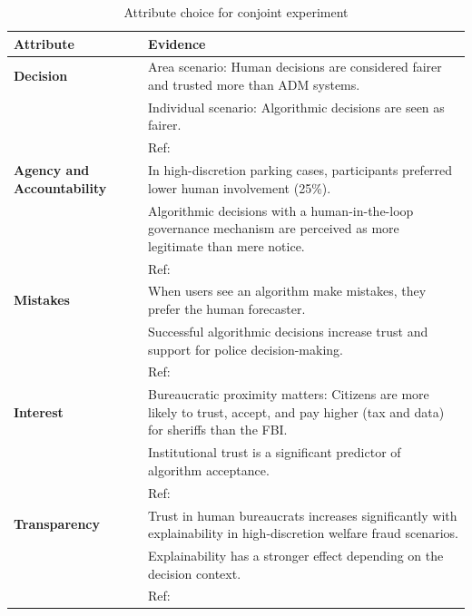 \begin{table}[H]
\centering
\renewcommand{\arraystretch}{1.3} %
\setlength{\tabcolsep}{6pt} %
\begin{tabular}[t]{|p{4cm}|p{10.5cm}|}
\hline
\textbf{Attribute} & \textbf{Evidence} \\ 
\hline
\textbf{Decision} & 
Area scenario: Human decisions are considered fairer and trusted more than ADM systems.  \\ 
& Individual scenario: Algorithmic decisions are seen as fairer. \citep{Hobson2021} \\ 
& Ref: \citep{Hobson2021, meier1975representative, Miller2020} \\  
\hline
\textbf{Agency and Accountability} & 
In high-discretion parking cases, participants preferred lower human involvement (25\%). \citep{Horvath2023} \\ 
& Algorithmic decisions with a human-in-the-loop governance mechanism are perceived as more legitimate than mere notice. \citep{Waldman2022} \\  
& Ref: \citep{Grimmelikhuijsen2022, Hobson2021, Horvath2023, Waldman2022, Schaap2023} \\  
\hline
\textbf{Mistakes} & 
When users see an algorithm make mistakes, they prefer the human forecaster. \citep{dietvorst2015algorithm} \\ 
& Successful algorithmic decisions increase trust and support for police decision-making. \citep{Hobson2021} \\  
& Ref: \citep{dietvorst2015algorithm, eubanks_automating_2018, Gritsenko2022Algorithmic, Hobson2021} \\  
\hline
\textbf{Interest}  & 
Bureaucratic proximity matters: Citizens are more likely to trust, accept, and pay higher (tax and data) for sheriffs than the FBI. \citep{Schiff2023} \\ 
& Institutional trust is a significant predictor of algorithm acceptance. \citep{Wenzelburger2022} \\  
& Ref: \citep{Wenzelburger2022, Schiff2023, Miller2020} \\  
\hline
\textbf{Transparency} & 
Trust in human bureaucrats increases significantly with explainability in high-discretion welfare fraud scenarios. \citep{Grimmelikhuijsen2022} \\ 
& Explainability has a stronger effect depending on the decision context. \citep{Grimmelikhuijsen2022} \\  
& Ref: \citep{Grimmelikhuijsen2022, pasquale_black_2015} \\  
\hline
\end{tabular}
\caption{Attribute choice for conjoint experiment}
\label{tab:adm_trust}
\end{table}